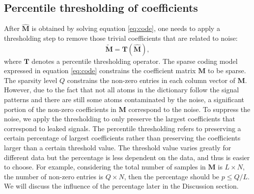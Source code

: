 \subsection{Percentile thresholding of coefficients}
After $\hat{\mathbf{M}}$ is obtained by solving equation \ref{eq:code}, one needs to apply a thresholding step to remove those trivial coefficients that are related to noise:
\begin{equation}
\label{eq:thr}
\tilde{\mathbf{M}} = \mathbf{T} (\hat{\mathbf{M}} ),
\end{equation}
where $\mathbf{T}$ denotes a percentile thresholding operator. The sparse coding model expressed in equation \ref{eq:code} constrains the coefficient matrix $\mathbf{M}$ to be sparse. The sparsity level $Q$ constrains the non-zero entries in each column vector of $\mathbf{M}$. However, due to the fact that not all atoms in the dictionary follow the signal patterns and there are still some atoms contaminated by the noise, a significant portion of the non-zero coefficients in $\mathbf{M}$ correspond to the noise. To suppress the noise, we apply the thresholding to only preserve the largest coefficients that correspond to leaked signals.  The percentile thresholding refers to preserving a certain percentage of largest coefficients rather than preserving the coefficients larger than a certain threshold value. The threshold value varies greatly for different data but the percentage is less dependent on the data, and thus is easier to choose. For example, considering the total number of samples in $\mathbf{M}$ is $L\times N$, the number of non-zero entries is $Q\times N$, then the percentage should be $p\le Q/L$. We will discuss the influence of the percentage later in the Discussion section.

